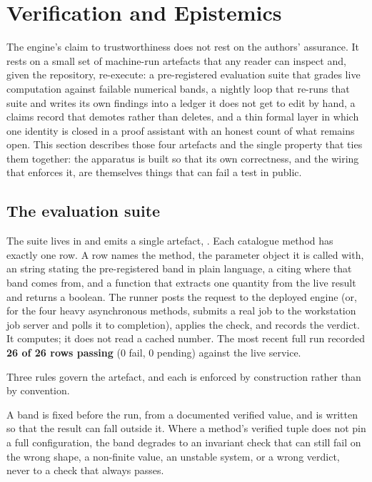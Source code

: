 \section{Verification and Epistemics}
\label{sec:verification}

The engine's claim to trustworthiness does not rest on the authors' assurance.
It rests on a small set of machine-run artefacts that any reader can inspect and,
given the repository, re-execute: a pre-registered evaluation suite that grades
live computation against failable numerical bands, a nightly loop that re-runs
that suite and writes its own findings into a ledger it does not get to edit by
hand, a claims record that demotes rather than deletes, and a thin formal layer
in which one identity is closed in a proof assistant with an honest count of what
remains open. This section describes those four artefacts and the single property
that ties them together: the apparatus is built so that its own correctness, and
the wiring that enforces it, are themselves things that can fail a test in public.

\subsection{The evaluation suite}
\label{sec:verification-evals}

The suite lives in  and emits a single artefact,
. Each catalogue method has exactly one row. A row names the
method, the parameter object it is called with, an  string stating
the pre-registered band in plain language, a  citing where that band
comes from, and a  function that extracts one quantity from the live
result and returns a boolean. The runner posts the request to the deployed engine
(or, for the four heavy asynchronous methods, submits a real job to the
workstation job server and polls it to completion), applies the check, and records
the verdict. It computes; it does not read a cached number. The most recent full
run recorded \textbf{26 of 26 rows passing} (0 fail, 0 pending) against the live
service.

Three rules govern the artefact, and each is enforced by construction rather than
by convention.

\begin{principle}
A band is fixed before the run, from a documented verified value, and is written
so that the result can fall outside it. Where a method's verified tuple does not
pin a full configuration, the band degrades to an invariant check that can still
fail on the wrong shape, a non-finite value, an unstable system, or a wrong
verdict, never to a check that always passes.
\end{principle}

